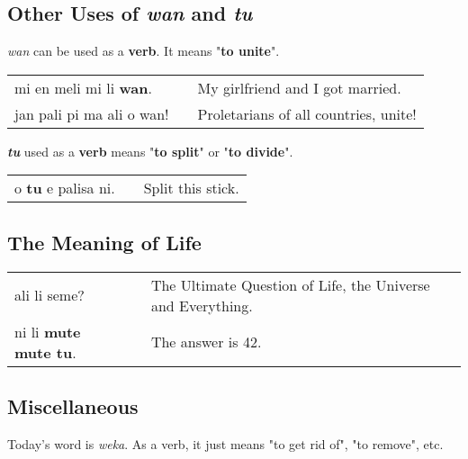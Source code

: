 \subsection*{Other Uses of \textit{wan} and \textit{tu}}
%
\textit{wan} can be used as a \textbf{verb}. 
It means "\textbf{to unite}". 

\begin{supertabular}{p{5,5cm}|ll}
mi en meli mi li \textbf{wan}. && My girlfriend and I got married. \\
jan pali pi ma ali o wan! && Proletarians of all countries, unite! \\

\end{supertabular} 

\textbf{\textit{tu}} used as a \textbf{verb} means "\textbf{to split}" or "\textbf{to divide}". 

\begin{supertabular}{p{5,5cm}|ll}
o \textbf{tu} e palisa ni. && Split this stick.  \\
\end{supertabular} 

\subsection*{The Meaning of Life}

\begin{supertabular}{p{5,5cm}|ll}
ali li seme? &&  The Ultimate Question of Life, the Universe and Everything. \\
ni li \textbf{mute mute tu}.  && The answer is 42. \\
\end{supertabular} 

%
\newpage
\subsection*{Miscellaneous}
%
Today's word is \textit{weka}. 
As a verb, it just means "to get rid of", "to remove", etc. 

